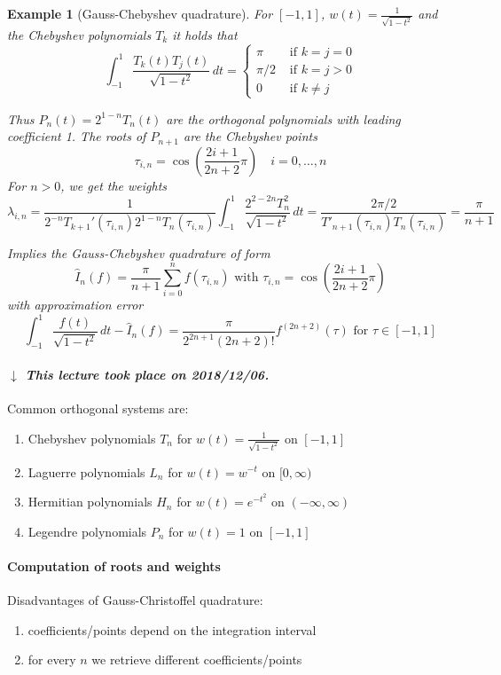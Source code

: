 \documentclass[a4paper]{article}
\newcounter{lecref}[section]
\numberwithin{lecref}{section}
\theoremstyle{break}
\newtheorem{example}[lecref]{Example}
\newcommand{\dateref}[1]{%
  \begin{mdframed}[backgroundcolor=gray!10,innerbottommargin=0pt,innertopmargin=0pt]
    \paragraph{\textit{$\downarrow$ This lecture took place on #1.}}%
  \end{mdframed}%
}
\begin{document}
\begin{example}[Gauss-Chebyshev quadrature]
  For $[-1,1]$, $w(t) = \frac{1}{\sqrt{1 - t^2}}$ and the Chebyshev polynomials $T_k$ it holds that
  \[
    \int_{-1}^1 \frac{T_k(t) T_j(t)}{\sqrt{1 - t^2}} \, dt
    = \begin{cases}
      \pi & \text{ if } k = j = 0 \\
      \pi/2 & \text{ if } k = j > 0 \\
      0 & \text{ if } k \neq j
    \end{cases}
  \]

  Thus $P_n(t) = 2^{1-n} T_n(t)$ are the orthogonal polynomials with leading coefficient 1. The roots of $P_{n+1}$ are the Chebyshev points
  \[ \tau_{i,n} = \cos\left(\frac{2i+1}{2n+2} \pi\right) \quad i = 0,\dots,n \]
  For $n > 0$, we get the weights
  \[ \lambda_{i,n} = \frac{1}{2^{-n} T_{k+1}'(\tau_{i,n}) 2^{1-n} T_n(\tau_{i,n})} \int_{-1}^1 \frac{2^{2 - 2n} T_n^2}{\sqrt{1 - t^2}} \, dt = \frac{2\pi/2}{T'_{n+1}(\tau_{i,n}) T_n(\tau_{i,n})} = \frac{\pi}{n+1} \]

  Implies the Gauss-Chebyshev quadrature of form
  \[ \hat{I}_n(f) = \frac{\pi}{n+1} \sum_{i=0}^n f(\tau_{i,n}) \text{ with } \tau_{i,n} = \cos\left(\frac{2i+1}{2n+2} \pi\right) \]
  with approximation error
  \[ \int_{-1}^1 \frac{f(t)}{\sqrt{1 - t^2}} \, dt - \hat{I}_n(f) = \frac{\pi}{2^{2n+1} (2n+2)!} f^{(2n+2)}(\tau) \text{ for } \tau \in [-1,1] \]
\end{example}

\dateref{2018/12/06}

Common orthogonal systems are:
\begin{enumerate}
  \item Chebyshev polynomials $T_n$ for $w(t) = \frac{1}{\sqrt{1 - t^2}}$ on $[-1, 1]$
  \item Laguerre polynomials $L_n$ for $w(t) = w^{-t}$ on $[0, \infty)$
  \item Hermitian polynomials $H_n$ for $w(t) = e^{-t^2}$ on $(-\infty, \infty)$
  \item Legendre polynomials $P_n$ for $w(t) = 1$ on $[-1, 1]$
\end{enumerate}

\paragraph{Computation of roots and weights}

Disadvantages of Gauss-Christoffel quadrature:
\begin{enumerate}
  \item coefficients/points depend on the integration interval
  \item for every $n$ we retrieve different coefficients/points
\end{enumerate}
\end{document}

